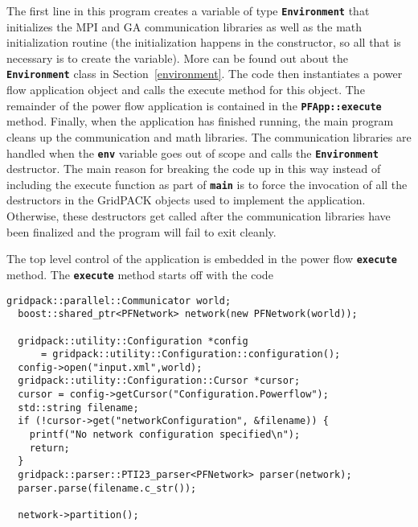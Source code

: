 The first line in this program creates a variable of type
\texttt{\textbf{Environment}} that initializes the MPI and GA communication
libraries as well as the math initialization routine (the initialization
happens in the constructor, so all that is necessary is to create the variable).
More can be found out about the \texttt{\textbf{Environment}} class in
Section~\ref{environment}.
The code then instantiates a power flow application object and calls the execute method for this object. The remainder of the power flow application is contained in the \texttt{\textbf{PFApp::execute}} method. Finally, when the application has finished running, the main program cleans up the communication and math libraries. The communication libraries are handled when the \texttt{\textbf{env}} variable goes out of scope and calls the \texttt{\textbf{Environment}} destructor. The main reason for breaking the code up in this way instead of including the execute function as part of \texttt{\textbf{main}} is to force the invocation of all the destructors in the GridPACK objects used to implement the application. Otherwise, these destructors get called after the communication libraries have been finalized and the program will fail to exit cleanly.

The top level control of the application is embedded in the power flow \texttt{\textbf{execute}} method. The \texttt{\textbf{execute}} method starts off with the code

{
\color{red}
\begin{Verbatim}[fontseries=b]
  gridpack::parallel::Communicator world;
  boost::shared_ptr<PFNetwork> network(new PFNetwork(world));

  gridpack::utility::Configuration *config
      = gridpack::utility::Configuration::configuration();
  config->open("input.xml",world);
  gridpack::utility::Configuration::Cursor *cursor;
  cursor = config->getCursor("Configuration.Powerflow");
  std::string filename;
  if (!cursor->get("networkConfiguration", &filename)) {
    printf("No network configuration specified\n");
    return;
  }
  gridpack::parser::PTI23_parser<PFNetwork> parser(network);
  parser.parse(filename.c_str());
  
  network->partition();
\end{Verbatim}
}

